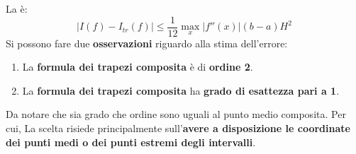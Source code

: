 \highspace
La  è:
\begin{equation}
	\left|I\left(f\right) - I_{tr}\left(f\right)\right| \le \dfrac{1}{12} \underset{x}{\max} \left|f''\left(x\right)\right| \left(b-a\right) H^{2}
\end{equation}
Si possono fare due \textbf{osservazioni} riguardo alla stima dell'errore:
\begin{enumerate}
	\item La \textbf{formula dei trapezi composita} è di \textbf{ordine 2}.
	
	\item La \textbf{formula dei trapezi composita} ha \textbf{grado di esattezza pari a 1}.
\end{enumerate}
Da notare che sia grado che ordine sono uguali al punto medio composita. Per cui,  La scelta risiede principalmente sull'\textbf{avere a disposizione le coordinate dei punti medi o dei punti estremi degli intervalli}.